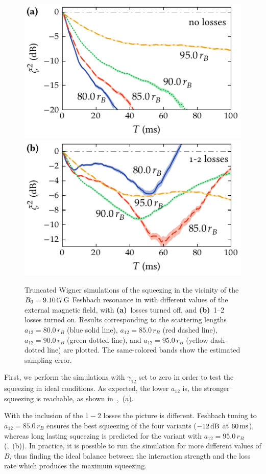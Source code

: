 \begin{figure}
    \centerline{%
    \includegraphics{figures_generated/bec_squeezing/feshbach_squeezing_no_losses.pdf}%
    \includegraphics{figures_generated/bec_squeezing/feshbach_squeezing.pdf}}

    \caption{
    Truncated Wigner simulations of the squeezing in the vicinity of the $B_0 = 9.1047\mbox{\ensuremath{\,\mathrm{G}}}$ Feshbach resonance in \Rb{} with different values of the external magnetic field, with \textbf{(a)}~losses turned off, and \textbf{(b)}~1--2 losses turned on.
    Results corresponding to the scattering lengths $a_{12}=80.0\,r_B$ (blue solid line), $a_{12}=85.0\,r_B$ (red dashed line), $a_{12}=90.0\,r_B$ (green dotted line), and $a_{12}=95.0\,r_B$ (yellow dash-dotted line) are plotted.
    The same-colored bands show the estimated sampling error.}

    \label{fig:bec-squeezing:feshbach:squeezing}
\end{figure}

First, we perform the simulations with $\gamma_{12}$ set to zero in order to test the squeezing in ideal conditions.
As expected, the lower $a_{12}$ is, the stronger squeezing is reachable, as shown in~,~(a).

With the inclusion of the $1-2$ losses the picture is different.
Feshbach tuning to $a_{12} = 85.0\,r_B$ ensures the best squeezing of the four variants ($-12\mbox{\ensuremath{\,\mathrm{dB}}}$ at $60\mbox{\ensuremath{\,\mathrm{ms}}}$), whereas long lasting squeezing is predicted for the variant with $a_{12} = 95.0\,r_B$ (,~(b)).
In practice, it is possible to run the simulation for more different values of $B$, thus finding the ideal balance between the interaction strength and the loss rate which produces the maximum squeezing.
